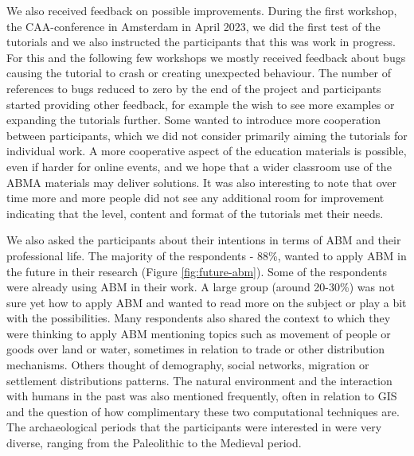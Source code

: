 \documentclass[
]{article}
\begin{document}
We also received feedback on possible improvements. During the first workshop, the CAA-conference in Amsterdam in April 2023, we did the first test of the tutorials and we also instructed the participants that this was work in progress. For this and the following few workshops we mostly received feedback about bugs causing the tutorial to crash or creating unexpected behaviour. The number of references to bugs reduced to zero by the end of the project and participants started providing other feedback, for example the wish to see more examples or expanding the tutorials further. Some wanted to introduce more cooperation between participants, which we did not consider primarily aiming the tutorials for individual work. A more cooperative aspect of the education materials is possible, even if harder for online events, and we hope that a wider classroom use of the ABMA materials may deliver solutions. It was also interesting to note that over time more and more people did not see any additional room for improvement indicating that the level, content and format of the tutorials met their needs.

We also asked the participants about their intentions in terms of ABM and their professional life. The majority of the respondents - 88\%, wanted to apply ABM in the future in their research (Figure \ref{fig:future-abm}). Some of the respondents were already using ABM in their work. A large group (around 20-30\%) was not sure yet how to apply ABM and wanted to read more on the subject or play a bit with the possibilities. Many respondents also shared the context to which they were thinking to apply ABM mentioning topics such as movement of people or goods over land or water, sometimes in relation to trade or other distribution mechanisms. Others thought of demography, social networks, migration or settlement distributions patterns. The natural environment and the interaction with humans in the past was also mentioned frequently, often in relation to GIS and the question of how complimentary these two computational techniques are. The archaeological periods that the participants were interested in were very diverse, ranging from the Paleolithic to the Medieval period.
\end{document}
